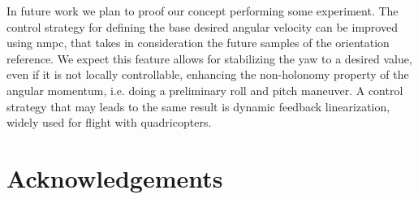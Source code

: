 \documentclass[letterpaper, 10 pt, conference]{ieeeconf}  %
\begin{document}
In future work we plan to proof our concept performing some experiment. 
The control strategy for defining the base desired angular velocity can be improved using \gls{nmpc}, that takes in consideration the future samples of the orientation reference.
We expect this feature allows for stabilizing the yaw to a desired value, even if it is not locally controllable, enhancing the non-holonomy property of the angular momentum, i.e. doing a preliminary roll and pitch maneuver. 
A control strategy that may leads to the same result is dynamic feedback linearization, widely used for flight with quadricopters.



\small
\section*{Acknowledgements}	



\printbibliography
\end{document}
